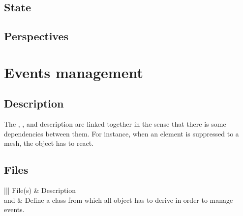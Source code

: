 \documentclass[a4paper,11pt,english]{sphinxmanual}
\begin{document}
\subsection{State}
\label{\detokenize{project/libdesc_misc:state}}

\subsection{Perspectives}
\label{\detokenize{project/libdesc_misc:perspectives}}

\section{Events management}
\label{\detokenize{project/libdesc_event:events-management}}\label{\detokenize{project/libdesc_event:dp-libdesc-event}}\label{\detokenize{project/libdesc_event::doc}}

\subsection{Description}
\label{\detokenize{project/libdesc_event:description}}
The , ,  and  description are linked together in the sense
that there is some dependencies between them. For instance, when an element is
suppressed to a mesh, the  object has to react.


\subsection{Files}
\label{\detokenize{project/libdesc_event:files}}

\begin{savenotes}\sphinxattablestart
\centering
\begin{tabular}[t]{|||}
\hline
\sphinxstyletheadfamily 
File(s)
&\sphinxstyletheadfamily 
Description
\\
\hline
{} and 
&
Define a class  from which all object has to derive in order to manage events.
\\
\hline
\end{tabular}
\par
\sphinxattableend\end{savenotes}
\end{document}
